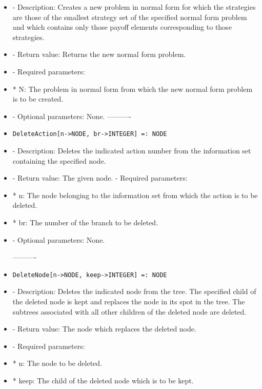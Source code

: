 \begin{itemize}
\bd
\item
- Description:  Creates a new problem in normal form for which the 
strategies are those of the smallest strategy set of the specified
normal form problem and which contains only those payoff elements 
corresponding to those strategies.
\item
- Return value:  Returns the new normal form problem.
\item
- Required parameters:
	
\bd
\item
*  N:  The problem in normal form from which the new normal form
problem is to be created.
\ed

\item  
- Optional parameters:  None.
\ed
----------
\item
\begin{verbatim}
DeleteAction[n->NODE, br->INTEGER] =: NODE
\end{verbatim}

\bd
\item
- Description:  Deletes the indicated action number from the information
set containing the specified node.
\item
- Return value:  The given node.
- Required parameters:
	
\bd
\item
*  n:  The node belonging to the information set from which the action
is to be deleted.
\item *  br:  The number of the branch to be deleted.
\ed

\item
- Optional parameters:  None.
\ed

----------

\item
\begin{verbatim}
DeleteNode[n->NODE, keep->INTEGER] =: NODE
\end{verbatim}

\bd
\item   
- Description:  Deletes the indicated node from the tree.  The specified
child of the deleted node is kept and replaces the node in its spot in
the tree.  The subtrees associated with all other children of the
deleted node are deleted.
\item
- Return value:  The node which replaces the deleted node.
\item
- Required parameters:
	
\bd
\item
*  n:  The node to be deleted.
\item
*  keep:  The child of the deleted node which is to be kept.
\ed


\end{itemize}
